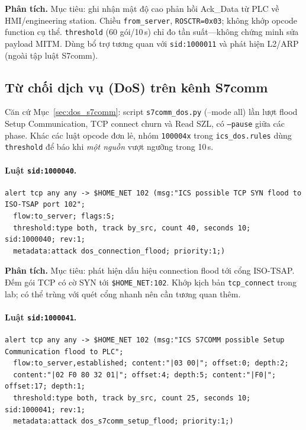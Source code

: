 \documentclass[../main.tex]{subfiles}
\begin{document}
\noindent\textbf{Phân tích.}
Mục tiêu: ghi nhận mật độ cao phản hồi Ack\_Data từ PLC về HMI/engineering station. Chiều \texttt{from\_server}, \texttt{ROSCTR=0x03}; không khớp opcode function cụ thể. \texttt{threshold} (60 gói/10\,s) chỉ đo tần suất---không chứng minh sửa payload MITM. Dùng bổ trợ tương quan với \texttt{sid:1000011} và phát hiện L2/ARP (ngoài tập luật S7comm).

\subsection{Từ chối dịch vụ (DoS) trên kênh S7comm}
\label{sec:rules-dos}

Căn cứ Mục~\ref{sec:dos_s7comm}: script \texttt{s7comm\_dos.py} (--mode all) lần lượt flood Setup Communication, TCP connect churn và Read SZL, có \texttt{--pause} giữa các phase. Khác các luật opcode đơn lẻ, nhóm \texttt{100004x} trong \texttt{ics\_dos.rules} dùng \texttt{threshold} để báo khi \emph{một nguồn} vượt ngưỡng trong 10\,s.

\paragraph{Luật \texttt{sid:1000040}.}
\begin{footnotesize}
\begin{verbatim}
alert tcp any any -> $HOME_NET 102 (msg:"ICS possible TCP SYN flood to ISO-TSAP port 102";
  flow:to_server; flags:S;
  threshold:type both, track by_src, count 40, seconds 10; sid:1000040; rev:1;
  metadata:attack dos_connection_flood; priority:1;)
\end{verbatim}
\end{footnotesize}

\noindent\textbf{Phân tích.}
Mục tiêu: phát hiện dấu hiệu connection flood tới cổng ISO-TSAP. Đếm gói TCP có cờ SYN tới \texttt{\$HOME\_NET:102}. Khớp kịch bản \texttt{tcp\_connect} trong lab; có thể trùng với quét cổng nhanh nên cần tương quan thêm.

\paragraph{Luật \texttt{sid:1000041}.}
\begin{footnotesize}
\begin{verbatim}
alert tcp any any -> $HOME_NET 102 (msg:"ICS S7COMM possible Setup Communication flood to PLC";
  flow:to_server,established; content:"|03 00|"; offset:0; depth:2;
  content:"|02 F0 80 32 01|"; offset:4; depth:5; content:"|F0|"; offset:17; depth:1;
  threshold:type both, track by_src, count 25, seconds 10; sid:1000041; rev:1;
  metadata:attack dos_s7comm_setup_flood; priority:1;)
\end{verbatim}
\end{footnotesize}
\end{document}
